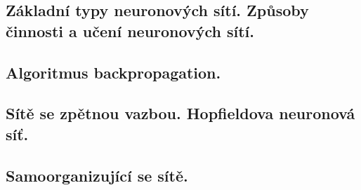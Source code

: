 \subsection{Základní typy neuronových sítí. Způsoby činnosti a učení neuronových sítí.}

\subsection{Algoritmus backpropagation.}

\subsection{Sítě se zpětnou vazbou. Hopfieldova neuronová síť.}

\subsection{Samoorganizující se sítě.}

